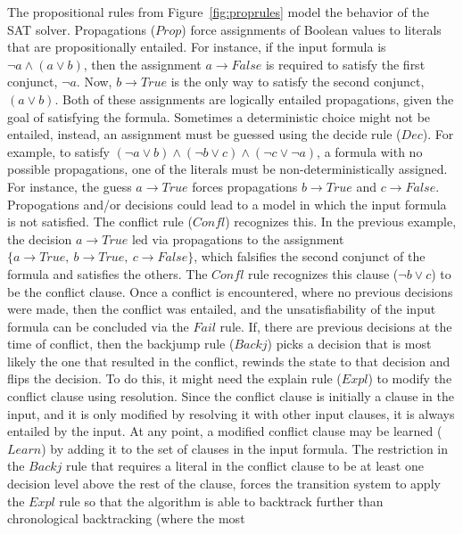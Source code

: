 \documentclass{article}
\begin{document}
	The propositional rules from
	Figure~\ref{fig:proprules}
	model the behavior of the SAT solver.
	Propagations ($Prop$) force 
	assignments of Boolean values to literals 
	that are propositionally entailed. 
	For instance, if the input 
	formula is $\neg a \land (a \lor b)$, 
	then the assignment $a \to False$ is 
	required to satisfy the first conjunct,
	$\neg a$. Now, $b \to True$ is the only 
	way to satisfy the second conjunct, 
	$(a \lor b)$. Both of these assignments 
	are logically entailed propagations, 
	given the goal of satisfying the formula. 
	Sometimes a deterministic choice 
	might not be entailed, instead, 
	an assignment must be guessed 
	using the decide rule ($Dec$). For 
	example, to 
	satisfy $(\neg a \lor b) \land 
	(\neg b \lor c) \land (\neg c \lor 
	\neg a)$, a formula 
	with no possible propagations, 
	one of the literals must be 
	non-deterministically assigned.
	For instance, the guess $a \to True$
	forces propagations $b \to True$ and 
	$c \to False$. Propogations and/or 
	decisions could lead to a model in 
	which the input formula is not satisfied. 
	The conflict rule ($Confl$) recognizes 
	this. In the previous example, the 
	decision $a \to True$ led via 
	propagations to the assignment
	$\{a \to True,\ b \to True,\ 
	c \to False\}$, which falsifies 
	the second conjunct of the formula 
	and satisfies the others. The 
	$Confl$ rule recognizes this 
	clause ($\neg b \lor c$) to be the 
	conflict clause. Once a conflict is 
	encountered, where no previous 
	decisions were made, then the 
	conflict was entailed, and the 
	unsatisfiability of the input formula
	can be concluded via the $Fail$ rule. 
	If, there are previous decisions at
	the time of conflict, then the backjump
	rule ($Backj$) picks a decision that is 
	most likely the one that resulted in 
	the conflict, rewinds the state to 
	that decision and flips the decision. 
	To do this, it might need the explain 
	rule ($Expl$) to modify the 
	conflict clause using resolution. 
	Since the conflict clause is initially 
	a clause in the input, and it is only 
	modified by resolving it with other 
	input clauses, it is always entailed 
	by the input. At any point, a modified 
	conflict clause may be learned 
	($Learn$) by adding it to the 
	set of clauses in the input formula. 
	The restriction in the $Backj$ rule 
	that requires a literal in the 
	conflict clause to be at least 
	one decision level above the rest of 
	the clause, forces the transition 
	system to apply the $Expl$ rule 
	so that the algorithm is able to 
	backtrack further than chronological
	backtracking (where the most 
\end{document}
